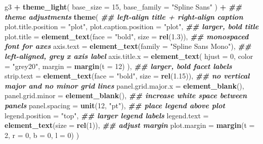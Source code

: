 \documentclass[
]{krantz}
\makeatletter
\newenvironment{Shaded}{\begin{snugshade}}{\end{snugshade}}
\newcommand{\AttributeTok}[1]{\textcolor[rgb]{0.27,0.27,0.27}{#1}}
\newcommand{\DecValTok}[1]{\textcolor[rgb]{0.06,0.06,0.06}{#1}}
\newcommand{\DocumentationTok}[1]{\textcolor[rgb]{0.37,0.37,0.37}{\textbf{\textit{#1}}}}
\newcommand{\FloatTok}[1]{\textcolor[rgb]{0.06,0.06,0.06}{#1}}
\newcommand{\FunctionTok}[1]{\textcolor[rgb]{0.27,0.27,0.27}{\textbf{#1}}}
\newcommand{\NormalTok}[1]{#1}
\newcommand{\SpecialCharTok}[1]{\textcolor[rgb]{0.43,0.43,0.43}{\textbf{#1}}}
\newcommand{\StringTok}[1]{\textcolor[rgb]{0.5,0.5,0.5}{#1}}
\newenvironment{kframe}{%
\medskip{}
\setlength{\fboxsep}{.8em}
 \def\at@end@of@kframe{}%
 \ifinner\ifhmode%
  \def\at@end@of@kframe{\end{minipage}}%
  \begin{minipage}{\columnwidth}%
 \fi\fi%
 \def\FrameCommand##1{\hskip\@totalleftmargin \hskip-\fboxsep
 \colorbox{shadecolor}{##1}\hskip-\fboxsep
     \hskip-\linewidth \hskip-\@totalleftmargin \hskip\columnwidth}%
 \MakeFramed {\advance\hsize-\width
   \@totalleftmargin\z@ \linewidth\hsize
   \@setminipage}}%
 {\par\unskip\endMakeFramed%
 \at@end@of@kframe}
\renewenvironment{Shaded}{\begin{kframe}}{\end{kframe}}
\makeatother
\begin{document}
\begin{Shaded}
\begin{Highlighting}[]
\NormalTok{g3 }\SpecialCharTok{+}
  \FunctionTok{theme\_light}\NormalTok{(}
    \AttributeTok{base\_size =} \DecValTok{15}\NormalTok{, }\AttributeTok{base\_family =} \StringTok{"Spline Sans"}
\NormalTok{  ) }\SpecialCharTok{+}
  \DocumentationTok{\#\# theme adjustments}
  \FunctionTok{theme}\NormalTok{(}
    \DocumentationTok{\#\# left{-}align title + right{-}align caption}
    \AttributeTok{plot.title.position =} \StringTok{"plot"}\NormalTok{, }
    \AttributeTok{plot.caption.position =} \StringTok{"plot"}\NormalTok{, }
    \DocumentationTok{\#\# larger, bold title}
    \AttributeTok{plot.title =} \FunctionTok{element\_text}\NormalTok{(}\AttributeTok{face =} \StringTok{"bold"}\NormalTok{, }\AttributeTok{size =} \FunctionTok{rel}\NormalTok{(}\FloatTok{1.3}\NormalTok{)), }
    \DocumentationTok{\#\# monospaced font for axes}
    \AttributeTok{axis.text =} \FunctionTok{element\_text}\NormalTok{(}\AttributeTok{family =} \StringTok{"Spline Sans Mono"}\NormalTok{), }
    \DocumentationTok{\#\# left{-}aligned, grey x axis label}
    \AttributeTok{axis.title.x =} \FunctionTok{element\_text}\NormalTok{( }
      \AttributeTok{hjust =} \DecValTok{0}\NormalTok{, }\AttributeTok{color =} \StringTok{"grey20"}\NormalTok{, }\AttributeTok{margin =} \FunctionTok{margin}\NormalTok{(}\AttributeTok{t =} \DecValTok{12}\NormalTok{)}
\NormalTok{    ),}
    \DocumentationTok{\#\# larger, bold facet labels}
    \AttributeTok{strip.text =} \FunctionTok{element\_text}\NormalTok{(}\AttributeTok{face =} \StringTok{"bold"}\NormalTok{, }\AttributeTok{size =} \FunctionTok{rel}\NormalTok{(}\FloatTok{1.15}\NormalTok{)),}
    \DocumentationTok{\#\# no vertical major and no minor grid lines}
    \AttributeTok{panel.grid.major.x =} \FunctionTok{element\_blank}\NormalTok{(), }
    \AttributeTok{panel.grid.minor =} \FunctionTok{element\_blank}\NormalTok{(),}
    \DocumentationTok{\#\# increase white space between panels}
    \AttributeTok{panel.spacing =} \FunctionTok{unit}\NormalTok{(}\DecValTok{12}\NormalTok{, }\StringTok{"pt"}\NormalTok{),}
    \DocumentationTok{\#\# place legend above plot}
    \AttributeTok{legend.position =} \StringTok{"top"}\NormalTok{, }
    \DocumentationTok{\#\# larger legend labels}
    \AttributeTok{legend.text =} \FunctionTok{element\_text}\NormalTok{(}\AttributeTok{size =} \FunctionTok{rel}\NormalTok{(}\DecValTok{1}\NormalTok{)), }
    \DocumentationTok{\#\# adjust margin}
    \AttributeTok{plot.margin =} \FunctionTok{margin}\NormalTok{(}\AttributeTok{t =} \DecValTok{2}\NormalTok{, }\AttributeTok{r =} \DecValTok{0}\NormalTok{, }\AttributeTok{b =} \DecValTok{0}\NormalTok{, }\AttributeTok{l =} \DecValTok{0}\NormalTok{)}
\NormalTok{  )}
\end{Highlighting}
\end{Shaded}
\end{document}
